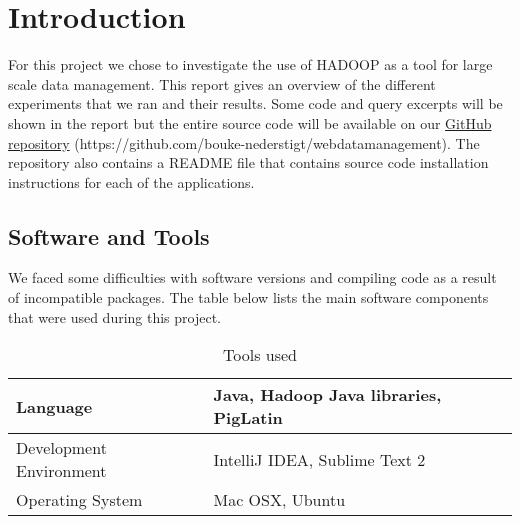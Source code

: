 \documentclass[Intro.tex]{subfiles}
\begin{document}
\section{Introduction}
For this project we chose to investigate the use of HADOOP as a tool for large scale data management. This report gives an overview of the different experiments that we ran and their results. Some code and query excerpts will be shown in the report but the entire source code will be available on our \href{https://github.com/bouke-nederstigt/webdatamanagement}{GitHub repository} (https://github.com/bouke-nederstigt/webdatamanagement). The repository also contains a README file that contains source code installation instructions for each of the applications.

\subsection{Software and Tools}
We faced some difficulties with software versions and compiling code as a result of incompatible packages. The table below lists the main software components that were used during this project. 

\begin{savenotes}
\begin{table}[H]
\centering
\caption{Tools used}
\label{tab:tools}
\begin{tabular}{ l|l }
  \hline
  Language & Java, Hadoop Java libraries, PigLatin \\ 
  \hline
  Development Environment & IntelliJ IDEA, Sublime Text 2 \\ \hline
Operating System & Mac OSX, Ubuntu \\ \hline  
\end{tabular}
\end{table}
\end{savenotes}
\end{document}
